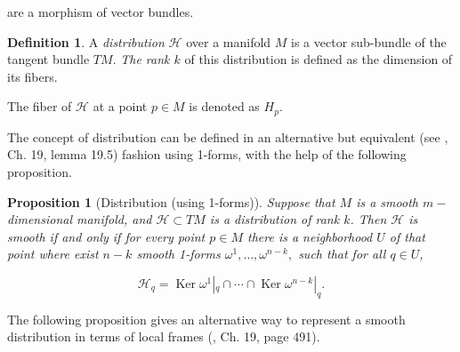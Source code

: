 \documentclass[12pt, letterpaper, reqno]{amsart}
\theoremstyle{definition}
\newtheorem{df}{Definition}
\theoremstyle{plain}
\newtheorem{prop}{Proposition}
\theoremstyle{remark}
\begin{document}
are a morphism of vector bundles.
\begin{df}
	
	A \textit{distribution} $ \mathcal{H} $ over a manifold $ M $  is a vector sub-bundle of the tangent bundle $ TM $. \textit{ The rank $ k $}  of this distribution is defined as the dimension of its fibers.

	The fiber of $ \mathcal{H} $ at a point $ p\in M $ is denoted as $ H_p. $ 
\end{df}

The concept of distribution can be defined in an alternative but equivalent (see \cite{lee2003introduction}, Ch. 19, lemma 19.5) fashion using 1-forms, with the help of the following proposition.

\begin{prop}[Distribution (using 1-forms)]
	Suppose that $ M $ is a smooth $ m- $dimensional manifold, and $ \mathcal{H} \subset TM$ is a distribution of rank $k$. Then $ \mathcal{H} $ is smooth if and only if for every point $ p\in M $ there is a neighborhood $ U $ of that point where exist $n-k$ smooth 1-forms $ \omega^1,\dots,\omega^{n-k}, $ such that for all $ q\in U $,

	$$ \mathcal{H}_q = \operatorname{Ker} \omega^1|_q\cap \cdots \cap\operatorname{Ker} \omega^{n-k}|_q.  $$ 
\end{prop}

The following proposition gives an alternative way to represent a smooth distribution in terms of local frames (\cite{lee2003introduction}, Ch. 19, page 491).
\end{document}
